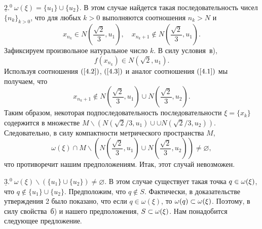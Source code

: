 \documentclass[12pt]{article}
\begin{document}
 $\underline{2}.^\textrm{0}\ \omega(\xi)=\{u_1\}\cup\{u_2\}$. В этом случае найдется такая последовательность чисел $\{n_k\}_{k>0}$, что для любых $k>0$ выполняются соотношения $n_k\!>\!N$ и
\begin{equation}
\label{4.2} 
x_{n_k}\in N\left(\frac{\sqrt{2}}{3},u_1\right),\quad x_{n_k+1}\notin N\left(\frac{\sqrt{2}}{3},u_1\right).
\end{equation}
Зафиксируем произвольное натуральное число $k$.
 В силу условия~в),
\begin{equation}
\label{4.3} 
f(x_{n_k})\in N\left(\sqrt{2},u_1\right).
\end{equation}
 Используя соотношения $(\ref{4.2})$, $(\ref{4.3})$ и аналог соотношения $(\ref{4.1})$ мы получаем, что $$x_{n_k+1}\notin N\left(\frac{\sqrt{2}}{3},u_1\right)\cup N\left(\frac{\sqrt{2}}{3},u_2\right).$$
 Таким образом, некоторая подпос\-ледовательность последовательности $\xi=\{x_k\}$ содержится в множестве $M\backslash \left(N\left(\sqrt{2}/3,u_1\right)\right.\cup\allowbreak\cup \left.N\left(\sqrt{2}/3,u_2\right)\right)$. Следовательно, в силу компактности метрического пространства $M$, 
 $$\omega(\xi)\cap M\backslash \left(N\left(\frac{\sqrt{2}}{3},u_1\right)\cup N\left(\frac{\sqrt{2}}{3},u_2\right)\right)\neq\varnothing,$$
что противоречит нашим предположениям. Итак, этот случай невозможен.

 $\underline{3}.^\textrm{0}\ \omega(\xi)\backslash\left(\{u_1\}\cup\{u_2\}\right)\neq\varnothing$. В этом случае существует такая точка $q\in\nobreak\omega(\xi)$, что $q\notin\{u_1\}\cup\{u_2\}$. Предположим, что $q\notin S$. Фактически, в доказательстве утверждения 2 было показано, что если $q\in\omega(\xi)$, то $\omega(q)\subset\nobreak\omega(\xi)$. 
Поэтому, в силу свойства~б) и нашего предположения, $S\subset\nobreak\omega(\xi)$. Нам понадобится следующее предложение.
\end{document}

